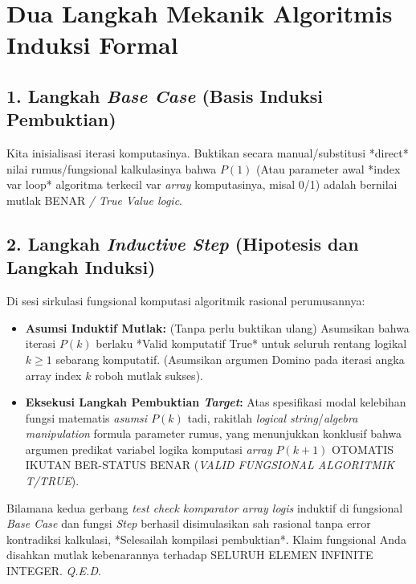 \documentclass[../main.tex]{subfiles}
\begin{document}
\section{Dua Langkah Mekanik Algoritmis Induksi Formal}

\subsection{1. Langkah \textit{Base Case} (Basis Induksi Pembuktian)}
Kita inisialisasi iterasi komputasinya. Buktikan secara manual/substitusi *direct* nilai rumus/fungsional kalkulasinya bahwa \textbf{$P(1)$} (Atau parameter awal *index var loop* algoritma terkecil var \textit{array} komputasinya, misal 0/1) adalah bernilai mutlak BENAR \textit{/ True Value logic}.

\subsection{2. Langkah \textit{Inductive Step} (Hipotesis dan Langkah Induksi)}
Di sesi sirkulasi fungsional komputasi algoritmik rasional perumusannya:
\begin{itemize}
    \item \textbf{Asumsi Induktif Mutlak:} (Tanpa perlu buktikan ulang) Asumsikan bahwa iterasi $P(k)$ berlaku *Valid komputatif True* untuk seluruh rentang logikal $k \geq 1$ sebarang komputatif. (Asumsikan argumen Domino pada iterasi angka array index $k$ roboh mutlak sukses).
    \item \textbf{Eksekusi Langkah Pembuktian \textit{Target}:} Atas spesifikasi modal kelebihan fungsi matematis \textit{asumsi $P(k)$} tadi, rakitlah \textit{logical string}/\textit{algebra manipulation} formula parameter rumus, yang menunjukkan konklusif bahwa argumen predikat variabel logika komputasi \textit{array} $P(k+1)$ OTOMATIS IKUTAN BER-STATUS BENAR (\textit{VALID FUNGSIONAL ALGORITMIK T/TRUE}).
\end{itemize}
Bilamana kedua gerbang \textit{test check komparator array logis} induktif di fungsional \textit{Base Case} dan fungsi \textit{Step} berhasil disimulasikan sah rasional tanpa error kontradiksi kalkulasi, *Selesailah kompilasi pembuktian*. Klaim fungsional Anda disahkan mutlak kebenarannya terhadap SELURUH ELEMEN INFINITE INTEGER. \textit{Q.E.D}.
\end{document}
